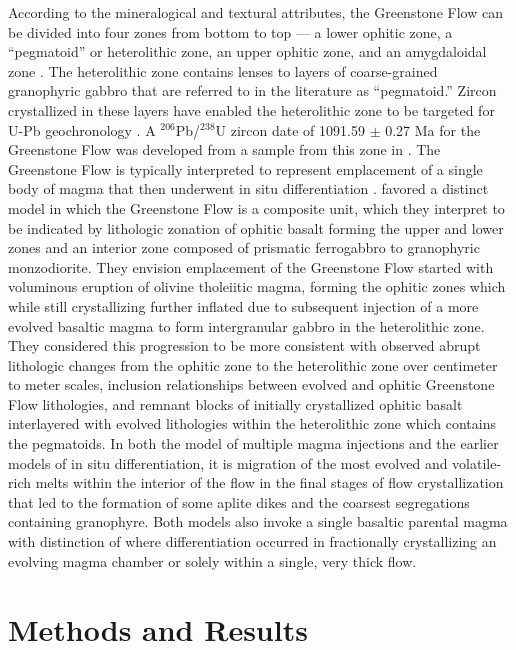 \documentclass[draft]{agujournal2019}
\begin{document}
According to the mineralogical and textural attributes, the Greenstone Flow can be divided into four zones from bottom to top --- a lower ophitic zone, a ``pegmatoid'' or heterolithic zone, an upper ophitic zone, and an amygdaloidal zone \cite{Cornwall1951b}. The heterolithic zone contains lenses to layers of coarse-grained granophyric gabbro that are referred to in the literature as ``pegmatoid.'' Zircon crystallized in these layers have enabled the heterolithic zone to be targeted for U-Pb geochronology \cite{Davis1990a, Swanson-Hysell2019a}. A $^{206}$Pb/$^{238}$U zircon date of 1091.59 $\pm$ 0.27 Ma for the Greenstone Flow was developed from a sample from this zone in . The Greenstone Flow is typically interpreted to represent emplacement of a single body of magma that then underwent in situ differentiation \cite{Huber1973a, Davis1990a}.  favored a distinct model in which the Greenstone Flow is a composite unit, which they interpret to be indicated by lithologic zonation of ophitic basalt forming the upper and lower zones and an interior zone composed of prismatic ferrogabbro to granophyric monzodiorite. They envision emplacement of the Greenstone Flow started with voluminous eruption of olivine tholeiitic magma, forming the ophitic zones which while still crystallizing further inflated due to subsequent injection of a more evolved basaltic magma to form intergranular gabbro in the heterolithic zone. They considered this progression to be more consistent with observed abrupt lithologic changes from the ophitic zone to the heterolithic zone over centimeter to meter scales, inclusion relationships between evolved and ophitic Greenstone Flow lithologies, and remnant blocks of initially crystallized ophitic basalt interlayered with evolved lithologies within the heterolithic zone which contains the pegmatoids. In both the  model of multiple magma injections and the earlier models of in situ differentiation, it is migration of the most evolved and volatile-rich melts within the interior of the flow in the final stages of flow crystallization that led to the formation of some aplite dikes and the coarsest segregations containing granophyre. Both models also invoke a single basaltic parental magma with distinction of where differentiation occurred in fractionally crystallizing an evolving magma chamber or solely within a single, very thick flow.

\section{Methods and Results}
\end{document}

